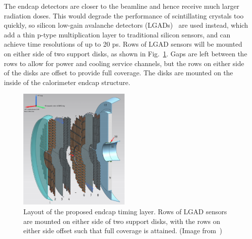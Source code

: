 The endcap detectors are closer to the beamline and hence receive much larger radiation
doses. This would degrade the performance of scintillating crystals too quickly, so silicon
low-gain avalanche detectors (LGADs)~\cite{Moffat:lgad} are used instead, which add a thin p-type multiplication layer to
traditional silicon sensors, and can achieve time resolutions of up to 20 ps.
Rows of LGAD sensors will be mounted on either side of two support disks, as shown in Fig.~\ref{fig:mtd_etl}.
Gaps are left between the rows to allow for power and cooling service channels, 
but the rows on either side of the disks are offset to provide full coverage.
The disks are mounted on the inside of the calorimeter endcap structure.

\begin{figure}[t]
  \begin{center}
    \includegraphics[width=0.49\textwidth]{figs/cms/etl.png}
    \caption{Layout of the proposed endcap timing layer. Rows of LGAD sensors
      are mounted on either side of two support disks, with the rows on either side
      offset such that full coverage is attained. (Image from~\cite{CMS:mtd})
            }
    \label{fig:mtd_etl}
  \end{center}
\end{figure}

